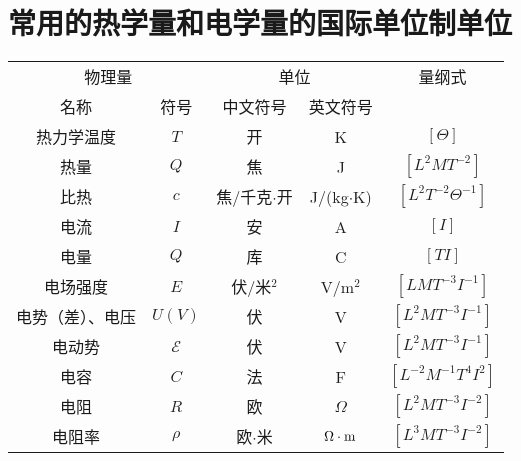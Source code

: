 \chapter{常用的热学量和电学量的国际单位制单位}

\begin{table}[htp]\centering
    \begin{tabular}{cc|cc|c}
        \hline
\multicolumn{2}{c|}{物理量} & \multicolumn{2}{c|}{单位} &量纲式\\
名称&符号 &中文符号&英文符号\\
\hline
热力学温度      &   $T$               &    开      &    K  &  $[\Theta]$   \\
热量      &   $Q$             &     焦     &    J  &  $[L^2MT^{-2}]$ \\
比热      &   $c$             &  焦/千克$\cdot $开        & J/(kg$\cdot$K)  & $[L^2T^{-2}\Theta^{-1}]$\\  
电流      &    $I$             &   安       &    A & $[I]$ \\
电量      &    $Q$            &    库      &    C & $[TI]$ \\
电场强度      &  $E$              &  伏/米$^2$        &   V/m$^2$  & $[LMT^{-3}I^{-1}]$ \\
电势（差）、电压      & $U(V)$              &    伏      &   V  & $[L^2MT^{-3}I^{-1}]$ \\
电动势      &  $\mathcal{E}$              &    伏      &    V & $[L^2MT^{-3}I^{-1}]$ \\
电容      &    $C$          &    法      &   F  & $[L^{-2}M^{-1}T^{4}I^{2}]$ \\
电阻      &    $R$        &     欧     &    $\Omega$       & $[L^{2}MT^{-3}I^{-2}]$ \\
电阻率      &    $\rho$          &   欧$\cdot$米       & $\Omega\cdot{\rm m}$   &  $[L^{3}MT^{-3}I^{-2}]$ \\
\hline
    \end{tabular}
\end{table}